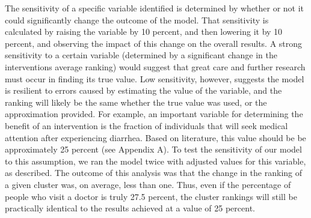 The sensitivity of a specific variable identified is determined by whether or not it could significantly change the outcome of the model.
That sensitivity is calculated by raising the variable by 10 percent, and then lowering it by 10 percent, and observing the impact of this change on the overall results.
A strong sensitivity to a certain variable (determined by a significant change in the interventions average ranking) would suggest that great care and further research must occur in finding its true value.
Low sensitivity, however, suggests the model is resilient to errors caused by estimating the value of the variable, and the ranking will likely be the same whether the true value was used, or the approximation provided.
For example, an important variable for determining the benefit of an intervention is the fraction of individuals that will seek medical attention after experiencing diarrhea.
Based on literature, this value should be be approximately 25 percent (see Appendix A).
To test the sensitivity of our model to this assumption, we ran the model twice with adjusted values for this variable, as described.
The outcome of this analysis was that the change in the ranking of a given cluster was, on average, less than one.
Thus, even if the percentage of people who visit a doctor is truly 27.5 percent, the cluster rankings will still be practically identical to the results achieved at a value of 25 percent.
